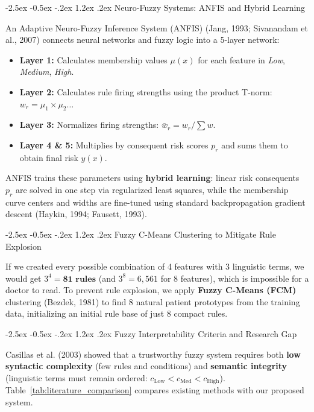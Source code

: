 \documentclass[12pt,a4paper,oneside]{report}
\makeatletter
\renewcommand\section{\@startsection {section}{1}{\z@}%
                                   {-2.5ex \@plus -0.5ex \@minus -.2ex}%
                                   {1.2ex \@plus .2ex}%
                                   {\normalfont\fontsize{13}{16}\selectfont\bfseries}}
\makeatother
\begin{document}
\section{Neuro-Fuzzy Systems: ANFIS and Hybrid Learning}

An Adaptive Neuro-Fuzzy Inference System (ANFIS) (Jang, 1993; Sivanandam et al., 2007) connects neural networks and fuzzy logic into a 5-layer network:
\begin{itemize}
    \setlength{\itemsep}{0pt}
    \setlength{\parskip}{0pt}
    \item \textbf{Layer 1:} Calculates membership values $\mu(x)$ for each feature in \textit{Low}, \textit{Medium}, \textit{High}.
    \item \textbf{Layer 2:} Calculates rule firing strengths using the product T-norm: $w_r = \mu_1 \times \mu_2 \dots$
    \item \textbf{Layer 3:} Normalizes firing strengths: $\bar{w}_r = w_r / \sum w$.
    \item \textbf{Layer 4 \& 5:} Multiplies by consequent risk scores $p_r$ and sums them to obtain final risk $y(x)$.
\end{itemize}
ANFIS trains these parameters using \textbf{hybrid learning}: linear risk consequents $p_r$ are solved in one step via regularized least squares, while the membership curve centers and widths are fine-tuned using standard backpropagation gradient descent (Haykin, 1994; Fausett, 1993).

\section{Fuzzy C-Means Clustering to Mitigate Rule Explosion}

If we created every possible combination of 4 features with 3 linguistic terms, we would get $3^4 = \mathbf{81\text{ rules}}$ (and $3^8 = 6{,}561$ for 8 features), which is impossible for a doctor to read. To prevent rule explosion, we apply \textbf{Fuzzy C-Means (FCM)} clustering (Bezdek, 1981) to find 8 natural patient prototypes from the training data, initializing an initial rule base of just 8 compact rules.

\section{Fuzzy Interpretability Criteria and Research Gap}

Casillas et al. (2003) showed that a trustworthy fuzzy system requires both \textbf{low syntactic complexity} (few rules and conditions) and \textbf{semantic integrity} (linguistic terms must remain ordered: $c_{\text{Low}} < c_{\text{Med}} < c_{\text{High}}$). Table~\ref{tab:literature_comparison} compares existing methods with our proposed system.
\end{document}
